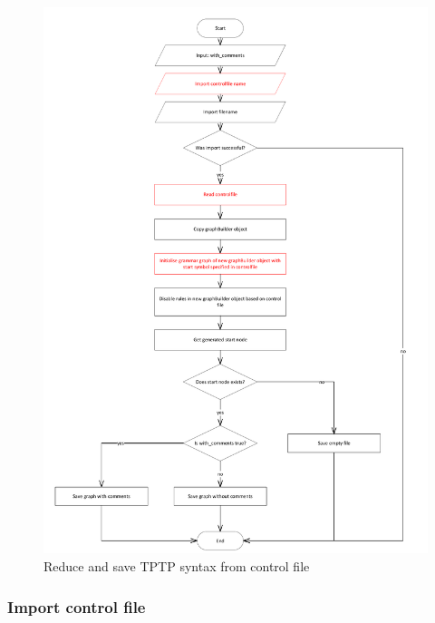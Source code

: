 \begin{figure}[H]
\includegraphics[width=1.05\textwidth]{images/implementation_reduce_and_save_tptp_syntax_control.pdf}
\caption{Reduce and save \ac{TPTP} syntax from control file}
\label{fig:ImplementationGUIReduceandSaveControl}
\end{figure}

\subsubsection{Import control file}\label{sec:ImplementationGUIImportControlFile}

